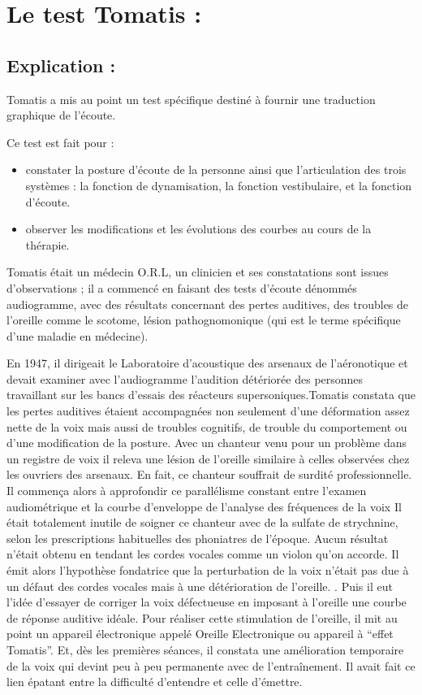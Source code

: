 \chapter{Le test Tomatis : }

\section{Explication :}

Tomatis a mis au point un test spécifique destiné à fournir une traduction
graphique de l'écoute.

Ce test est fait pour :
\begin{itemize}
\item constater la posture d'écoute de la personne ainsi que l'articulation
des trois systèmes : la fonction de dynamisation, la fonction vestibulaire,
et la fonction d'écoute.
\item observer les modifications et les évolutions des courbes au cours
de la thérapie.
\end{itemize}
Tomatis était un médecin O.R.L, un clinicien et  ses constatations
sont issues d'observations ; il a commencé en faisant
des tests d'écoute dénommés audiogramme, avec des résultats concernant  des pertes auditives, des troubles de l'oreille
comme le scotome, lésion pathognomonique (qui est le terme spécifique
d'une maladie en médecine). 

En 1947, il dirigeait le Laboratoire d'acoustique
des arsenaux de l'aéronotique et devait examiner avec l'audiogramme l'audition détériorée
des personnes travaillant sur les bancs d'essais des réacteurs supersoniques.Tomatis constata que les pertes auditives étaient accompagnées non seulement  d'une
déformation assez nette de la voix mais aussi de troubles cognitifs, de trouble du comportement ou d'une modification de la posture. Avec
un chanteur venu pour un problème dans un  registre de voix il releva une lésion de l'oreille similaire
à celles observées chez les ouvriers des arsenaux. En fait, ce chanteur
souffrait de surdité professionnelle. Il commença alors à approfondir
ce parallélisme constant entre l'examen audiométrique et la courbe
d'enveloppe de l'analyse des fréquences de la voix Il était totalement
inutile de soigner ce chanteur avec de la sulfate de
strychnine, selon les prescriptions habituelles des phoniatres de
l'époque. Aucun résultat n'était obtenu en tendant les cordes vocales
comme un violon qu'on accorde. Il émit alors l'hypothèse fondatrice
que la perturbation de la voix n'était pas due à un défaut des cordes
vocales mais à une détérioration de l'oreille. . Puis il eut l'idée
d'essayer de corriger la voix défectueuse en imposant à l'oreille
une courbe de réponse auditive idéale. Pour réaliser cette stimulation
de l'oreille, il mit au point un appareil électronique appelé Oreille
Electronique ou appareil à ``effet Tomatis''. Et, dès les premières
séances, il constata une amélioration temporaire de la voix qui devint
peu à peu permanente avec de l'entraînement. Il avait fait ce lien épatant entre la difficulté d'entendre et celle d'émettre.

